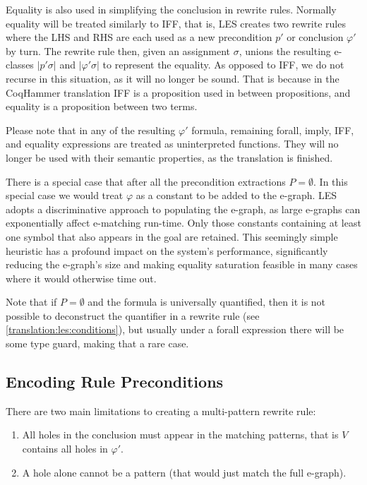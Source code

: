 Equality is also used in simplifying the conclusion in rewrite rules.
Normally equality will be treated similarly to IFF, that is, LES creates two rewrite rules where the LHS and RHS are each used as a new precondition $p'$ or conclusion $\varphi'$ by turn.
The rewrite rule then, given an assignment $\sigma$, unions the resulting e-classes $|p'\sigma|$ and $|\varphi'\sigma|$ to represent the equality.
As opposed to IFF, we do not recurse in this situation, as it will no longer be sound.
That is because in the CoqHammer translation IFF is a proposition used in between propositions, and equality is a proposition between two terms.

Please note that in any of the resulting $\varphi'$ formula, remaining forall, imply, IFF, and equality expressions are treated as uninterpreted functions.
They will no longer be used with their semantic properties, as the translation is finished.

There is a special case that after all the precondition extractions $P = \emptyset$.
In this special case we would treat $\varphi$ as a constant to be added to the e-graph.
LES adopts a discriminative approach to populating the e-graph, as large e-graphs can exponentially affect e-matching run-time.
Only those constants containing at least one symbol that also appears in the goal are retained.
This seemingly simple heuristic has a profound impact on the system's performance, significantly reducing the e-graph's size and making equality saturation feasible in many cases where it would otherwise time out.

Note that if $P = \emptyset$ and the formula is universally quantified, then it is not possible to deconstruct the quantifier in a rewrite rule (see \autoref{translation:les:conditions}), but usually under a forall expression there will be some type guard, making that a rare case.

\subsection{Encoding Rule Preconditions}
\label{translation:les:conditions}

There are two main limitations to creating a multi-pattern rewrite rule:
\begin{enumerate}
    \item All holes in the conclusion must appear in the matching patterns, that is $V$ contains all holes in $\varphi'$.
    \item A hole alone cannot be a pattern (that would just match the full e-graph).
\end{enumerate}

